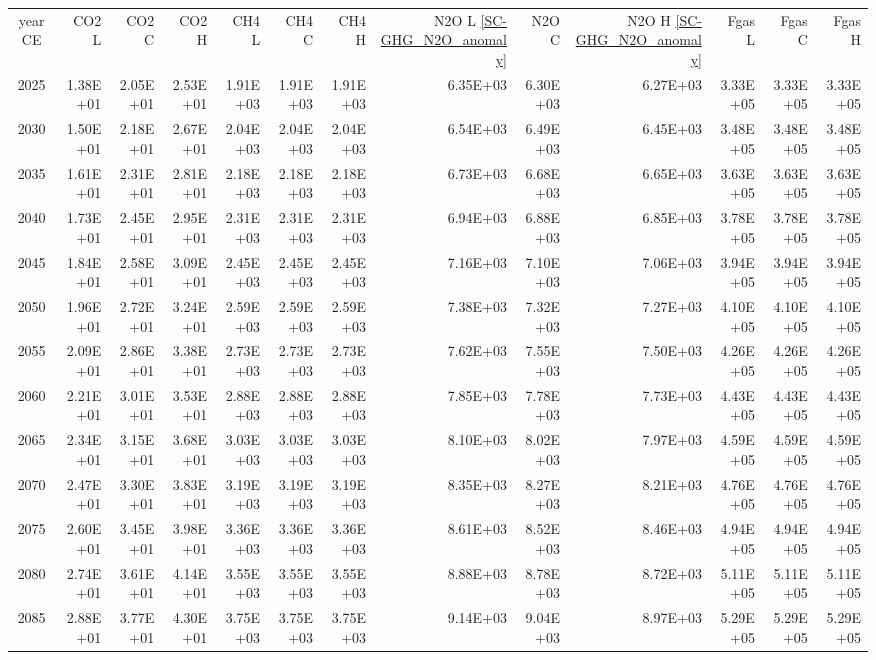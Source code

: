 \documentclass{article}
\begin{document}
\begin{table}
\begin{tabular}{crrr|rrr|rrr|rrr}
year CE  & CO2 L    & CO2 C    & CO2 H    & CH4 L    & CH4 C    & CH4 H    & N2O L \ref{SC-GHG_N2O_anomaly}     & N2O C      & N2O H \ref{SC-GHG_N2O_anomaly}    & Fgas L   & Fgas C   & Fgas H   \\
2025     & 1.38E+01 & 2.05E+01 & 2.53E+01 & 1.91E+03 & 1.91E+03 & 1.91E+03 & 6.35E+03 & 6.30E+03 & 6.27E+03 & 3.33E+05 & 3.33E+05 & 3.33E+05 \\
2030     & 1.50E+01 & 2.18E+01 & 2.67E+01 & 2.04E+03 & 2.04E+03 & 2.04E+03 & 6.54E+03 & 6.49E+03 & 6.45E+03 & 3.48E+05 & 3.48E+05 & 3.48E+05 \\
2035     & 1.61E+01 & 2.31E+01 & 2.81E+01 & 2.18E+03 & 2.18E+03 & 2.18E+03 & 6.73E+03 & 6.68E+03 & 6.65E+03 & 3.63E+05 & 3.63E+05 & 3.63E+05 \\
2040     & 1.73E+01 & 2.45E+01 & 2.95E+01 & 2.31E+03 & 2.31E+03 & 2.31E+03 & 6.94E+03 & 6.88E+03 & 6.85E+03 & 3.78E+05 & 3.78E+05 & 3.78E+05 \\
2045     & 1.84E+01 & 2.58E+01 & 3.09E+01 & 2.45E+03 & 2.45E+03 & 2.45E+03 & 7.16E+03 & 7.10E+03 & 7.06E+03 & 3.94E+05 & 3.94E+05 & 3.94E+05 \\
2050     & 1.96E+01 & 2.72E+01 & 3.24E+01 & 2.59E+03 & 2.59E+03 & 2.59E+03 & 7.38E+03 & 7.32E+03 & 7.27E+03 & 4.10E+05 & 4.10E+05 & 4.10E+05 \\
2055     & 2.09E+01 & 2.86E+01 & 3.38E+01 & 2.73E+03 & 2.73E+03 & 2.73E+03 & 7.62E+03 & 7.55E+03 & 7.50E+03 & 4.26E+05 & 4.26E+05 & 4.26E+05 \\
2060     & 2.21E+01 & 3.01E+01 & 3.53E+01 & 2.88E+03 & 2.88E+03 & 2.88E+03 & 7.85E+03 & 7.78E+03 & 7.73E+03 & 4.43E+05 & 4.43E+05 & 4.43E+05 \\
2065     & 2.34E+01 & 3.15E+01 & 3.68E+01 & 3.03E+03 & 3.03E+03 & 3.03E+03 & 8.10E+03 & 8.02E+03 & 7.97E+03 & 4.59E+05 & 4.59E+05 & 4.59E+05 \\
2070     & 2.47E+01 & 3.30E+01 & 3.83E+01 & 3.19E+03 & 3.19E+03 & 3.19E+03 & 8.35E+03 & 8.27E+03 & 8.21E+03 & 4.76E+05 & 4.76E+05 & 4.76E+05 \\
2075     & 2.60E+01 & 3.45E+01 & 3.98E+01 & 3.36E+03 & 3.36E+03 & 3.36E+03 & 8.61E+03 & 8.52E+03 & 8.46E+03 & 4.94E+05 & 4.94E+05 & 4.94E+05 \\
2080     & 2.74E+01 & 3.61E+01 & 4.14E+01 & 3.55E+03 & 3.55E+03 & 3.55E+03 & 8.88E+03 & 8.78E+03 & 8.72E+03 & 5.11E+05 & 5.11E+05 & 5.11E+05 \\
2085     & 2.88E+01 & 3.77E+01 & 4.30E+01 & 3.75E+03 & 3.75E+03 & 3.75E+03 & 9.14E+03 & 9.04E+03 & 8.97E+03 & 5.29E+05 & 5.29E+05 & 5.29E+05 \\

\end{tabular}
\end{table}
\end{document}
